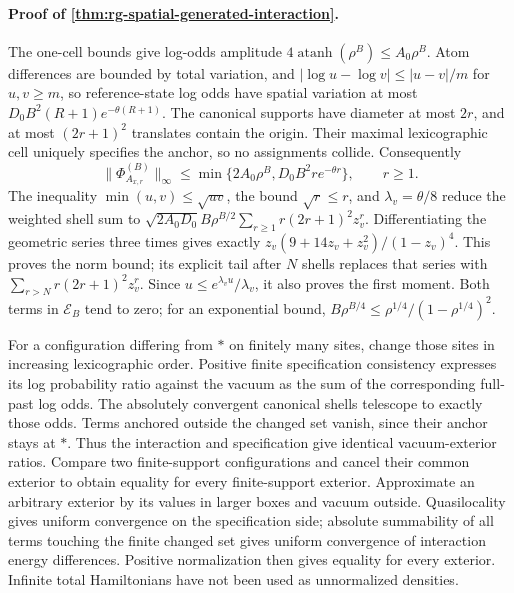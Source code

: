 \paragraph{Proof of \cref{thm:rg-spatial-generated-interaction}.}
The one-cell bounds give log-odds amplitude
\(4\operatorname{atanh}(\rho^B)\le A_0\rho^B\). Atom differences are
bounded by total variation, and
\(|\log u-\log v|\le|u-v|/m\) for \(u,v\ge m\), so reference-state
log odds have spatial variation at most
\(D_0B^2(R+1)e^{-\theta(R+1)}\). The canonical supports have diameter at
most \(2r\), and at most \((2r+1)^2\) translates contain the origin.
Their maximal lexicographic cell uniquely specifies the anchor, so no
assignments collide. Consequently
\begin{equation}
 \|\Phi^{(B)}_{A_{x,r}}\|_\infty
 \le\min\{2A_0\rho^B,D_0B^2r e^{-\theta r}\},\qquad r\ge1.
 \label{eq:rg-spatial-proof-shell-minimum}
\end{equation}
The inequality \(\min(u,v)\le\sqrt{uv}\), the bound
\(\sqrt r\le r\), and \(\lambda_v=\theta/8\) reduce the weighted shell
sum to
\(\sqrt{2A_0D_0}B\rho^{B/2}\sum_{r\ge1}r(2r+1)^2z_v^r\).
Differentiating the geometric series three times gives exactly
\(z_v(9+14z_v+z_v^2)/(1-z_v)^4\). This proves the norm bound; its explicit
tail after \(N\) shells replaces that series with
\(\sum_{r>N}r(2r+1)^2z_v^r\). Since
\(u\le e^{\lambda_vu}/\lambda_v\), it also proves the first moment.
Both terms in \(\mathcal E_B\) tend to zero; for an exponential bound,
\(B\rho^{B/4}\le\rho^{1/4}/(1-\rho^{1/4})^2\).

For a configuration differing from \(*\) on finitely many sites, change
those sites in increasing lexicographic order. Positive finite
specification consistency expresses its log probability ratio against the
vacuum as the sum of the corresponding full-past log odds. The absolutely
convergent canonical shells telescope to exactly those odds. Terms anchored
outside the changed set vanish, since their anchor stays at \(*\). Thus
the interaction and specification give identical vacuum-exterior ratios.
Compare two finite-support configurations and cancel their common
exterior to obtain equality for every finite-support exterior. Approximate
an arbitrary exterior by its values in larger boxes and vacuum outside.
Quasilocality gives uniform convergence on the specification side; absolute
summability of all terms touching the finite changed set gives uniform
convergence of interaction energy differences. Positive normalization then
gives equality for every exterior. Infinite total Hamiltonians have not
been used as unnormalized densities.

